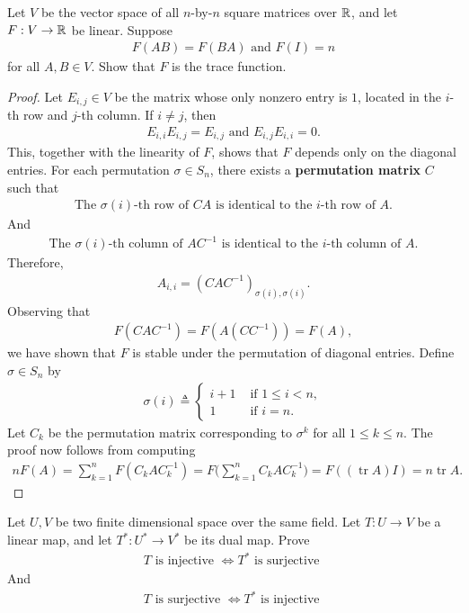 \documentclass{report}
\begin{document}
\begin{question}{}{}
Let $V$ be the vector space of all $n$-by-$n$ square matrices over $\mathbb{R}$, and let $F:V\rightarrow \mathbb{R}$ be linear. Suppose  
\begin{align*}
F(AB)=F(BA)\text{ and }F(I)=n
\end{align*}
for all $A,B \in V$. Show that $F$ is the trace function. 
\end{question}
\begin{proof}
Let $E_{i,j}\in V$ be the matrix whose only nonzero entry is $1$, located in the $i$-th row and $j$-th column. If $i \neq j$, then  
\begin{align*}
E_{i,i}E_{i,j}=E_{i,j}\text{ and }E_{i,j}E_{i,i}=0.
\end{align*}
This, together with the linearity of $F$, shows that $F$ depends only on the diagonal entries. For each permutation $\sigma \in S_n$, there exists a \textbf{permutation matrix} $C$ such that  
\begin{align*}
\text{The $\sigma(i)$-th row of }CA\text{ is identical to the $i$-th row of }A.
\end{align*}
And  
\begin{align*}
\text{The $\sigma(i)$-th column of }AC^{-1}\text{ is identical to the $i$-th column of }A.
\end{align*}
Therefore,  
\begin{align*}
  A_{i,i}=(CAC^{-1})_{\sigma (i),\sigma (i)}.
\end{align*}
Observing that  
\begin{align*}
F(CAC^{-1})=F(A(CC^{-1}))=F(A),
\end{align*}
we have shown that $F$ is stable under the permutation of diagonal entries. Define $\sigma \in S_n$ by  
\begin{align*}
\sigma(i)\triangleq \begin{cases}
  i+1& \text{ if } 1\leq i<n, \\
  1& \text{ if } i=n.
\end{cases}
\end{align*}
Let $C_k$ be the permutation matrix corresponding to $\sigma^k$ for all $1\leq k\leq n$. The proof now follows from computing  
\begin{align*}
nF(A)= \sum_{k=1}^{n}F(C_kAC_k^{-1})=F\Big(\sum_{k=1}^n C_kAC_k^{-1}\Big)= F((\operatorname{tr}A)I)=n\operatorname{tr}A.
\end{align*}
\end{proof}
\begin{question}{}{}
  Let $U,V$ be two finite dimensional space over the same field. Let  $T:U\rightarrow V$ be a linear map, and let $T^*:U^*\rightarrow V^*$ be its dual map. Prove 
\begin{align*}
T\text{ is injective }\iff T^*\text{ is surjective }   
\end{align*}
And 
\begin{align*}
T\text{ is surjective }\iff T^*\text{ is injective }
\end{align*}
\end{question}
\end{document}

